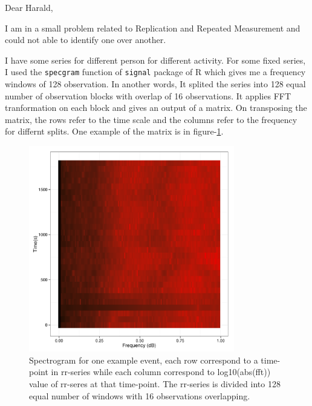 \documentclass[11pt]{article}\usepackage[]{graphicx}\usepackage[]{color}
\newenvironment{knitrout}{}{} %
\begin{document}
Dear Harald,

I am in a small problem related to Replication and Repeated Measurement and could not able to identify one over another. 

I have some series for different person for different activity. For some fixed series, I used the \texttt{specgram} function of \texttt{signal} package of R which gives me a frequency windows of 128 observation. In another words, It splited the series into 128 equal number of observation blocks with overlap of 16 observations. It applies FFT tranformation on each block and gives an output of a matrix. On transposing the matrix, the rows refer to the time scale and the columns refer to the frequency for differnt splits. One example of the matrix is in figure-\ref{fig:specGram}. 

\begin{knitrout}
\color{fgcolor}\begin{figure}[H]

{\centering \includegraphics[width=0.8\textwidth]{figure/specGram-1} 

}

\caption[Spectrogram for one example event, each row correspond to a time-point in rr-series while each column correspond to log10(abs(fft)) value of rr-seres at that time-point]{Spectrogram for one example event, each row correspond to a time-point in rr-series while each column correspond to log10(abs(fft)) value of rr-seres at that time-point. The rr-series is divided into 128 equal number of windows with 16 observations overlapping.}\label{fig:specGram}
\end{figure}


\end{knitrout}
\end{document}
